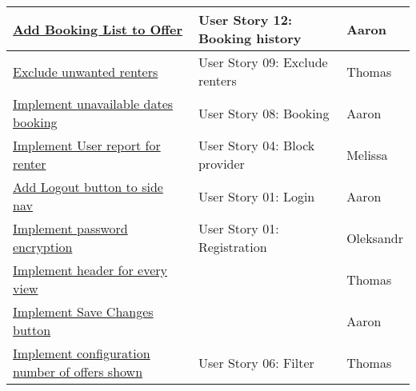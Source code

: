 \begin{tabular}{|l|l|l|}
	\hline
	\href{https://gitlab.rz.uni-bamberg.de/swt/teaching/2021-ws/swt-swl-b/group-a/-/issues/74}{Add Booking List to Offer} & User Story 12: Booking history & Aaron \\
	\hline
	\href{https://gitlab.rz.uni-bamberg.de/swt/teaching/2021-ws/swt-swl-b/group-a/-/issues/133}{Exclude unwanted renters} & User Story 09: Exclude renters & Thomas \\
	\hline
	\href{https://gitlab.rz.uni-bamberg.de/swt/teaching/2021-ws/swt-swl-b/group-a/-/issues/117}{Implement unavailable dates booking} & User Story 08: Booking & Aaron \\
	\hline
	\href{https://gitlab.rz.uni-bamberg.de/swt/teaching/2021-ws/swt-swl-b/group-a/-/issues/168}{Implement User report for renter} & User Story 04: Block provider & Melissa \\
	\hline
	\href{https://gitlab.rz.uni-bamberg.de/swt/teaching/2021-ws/swt-swl-b/group-a/-/issues/137}{Add Logout button to side nav} & User Story 01: Login & Aaron \\
	\hline
	\href{https://gitlab.rz.uni-bamberg.de/swt/teaching/2021-ws/swt-swl-b/group-a/-/issues/118}{Implement password encryption} & User Story 01: Registration & Oleksandr \\
	\hline
	\href{https://gitlab.rz.uni-bamberg.de/swt/teaching/2021-ws/swt-swl-b/group-a/-/issues/144}{Implement header for every view} &  & Thomas \\
	\hline
    \href{https://gitlab.rz.uni-bamberg.de/swt/teaching/2021-ws/swt-swl-b/group-a/-/issues/139}{Implement Save Changes button} &  & Aaron \\
	\hline
    \href{https://gitlab.rz.uni-bamberg.de/swt/teaching/2021-ws/swt-swl-b/group-a/-/issues/146}{Implement configuration number of offers shown} & User Story 06: Filter & Thomas \\
	\hline
\end{tabular}
